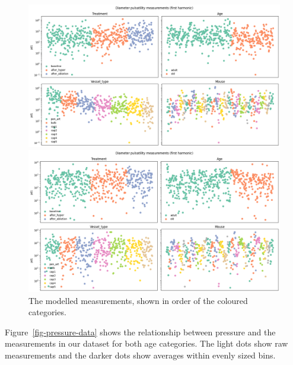 \documentclass[
  letterpaper,
  DIV=11,
  numbers=noendperiod,
  oneside]{scrartcl}
\theoremstyle{plain}
\theoremstyle{remark}
\begin{document}
\begin{figure}

\begin{minipage}{\linewidth}
\includegraphics{../plots/pulsatility-diameter-measurements.png}\end{minipage}%
\newline
\begin{minipage}{\linewidth}
\includegraphics{../plots/pulsatility-center-measurements.png}\end{minipage}%

\caption{\label{fig-pulsatility-dataset}The modelled measurements, shown
in order of the coloured categories.}

\end{figure}%

Figure~\ref{fig-pressure-data} shows the relationship between pressure
and the measurements in our dataset for both age categories. The light
dots show raw measurements and the darker dots show averages within
evenly sized bins.
\end{document}

